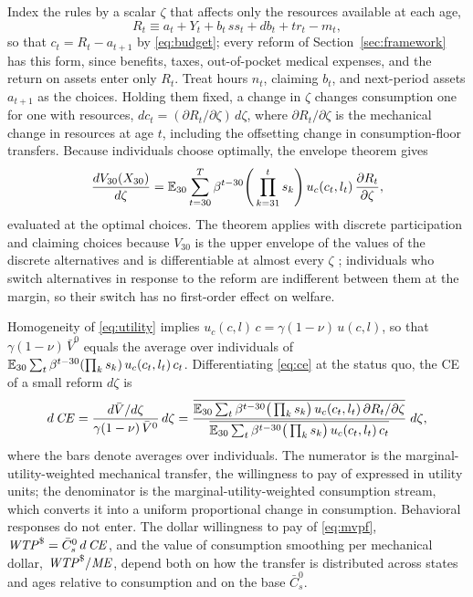 Index the rules by a scalar $\zeta$ that affects only the resources available at each age,
\begin{equation*}
R_t\equiv a_t+Y_t+b_t\,ss_t+db_t+tr_t-m_t,
\end{equation*}
so that $c_t=R_t-a_{t+1}$ by \eqref{eq:budget}; every reform of Section~\ref{sec:framework} has this form, since benefits, taxes, out-of-pocket medical expenses, and the return on assets enter only $R_t$. Treat hours $n_t$, claiming $b_t$, and next-period assets $a_{t+1}$ as the choices. Holding them fixed, a change in $\zeta$ changes consumption one for one with resources, $dc_t=(\partial R_t/\partial\zeta)\,d\zeta$, where $\partial R_t/\partial\zeta$ is the mechanical change in resources at age $t$, including the offsetting change in consumption-floor transfers. Because individuals choose optimally, the envelope theorem gives
\begin{equation*}
\frac{dV_{30}(X_{30})}{d\zeta}=\mathbb{E}_{30}\sum_{t=30}^{T}\beta^{t-30}\Bigg(\prod_{k=31}^{t}s_k\Bigg)\,u_c(c_t,l_t)\,\frac{\partial R_t}{\partial\zeta},
\end{equation*}
evaluated at the optimal choices. The theorem applies with discrete participation and claiming choices because $V_{30}$ is the upper envelope of the values of the discrete alternatives and is differentiable at almost every $\zeta$ \citep{milgrom2002envelope}; individuals who switch alternatives in response to the reform are indifferent between them at the margin, so their switch has no first-order effect on welfare.

Homogeneity of \eqref{eq:utility} implies $u_c(c,l)\,c=\gamma(1-\nu)\,u(c,l)$, so that $\gamma(1-\nu)\,\bar V^{0}$ equals the average over individuals of $\mathbb{E}_{30}\sum_{t}\beta^{t-30}(\prod_{k}s_k)\,u_c(c_t,l_t)\,c_t$. Differentiating \eqref{eq:ce} at the status quo, the CE of a small reform $d\zeta$ is
\begin{equation*}
d\,\mathit{CE}=\frac{d\bar V/d\zeta}{\gamma(1-\nu)\,\bar V^{0}}\,d\zeta
=\frac{\overline{\mathbb{E}_{30}\sum_{t}\beta^{t-30}\big(\prod_{k}s_k\big)\,u_c(c_t,l_t)\,\partial R_t/\partial\zeta}}{\overline{\mathbb{E}_{30}\sum_{t}\beta^{t-30}\big(\prod_{k}s_k\big)\,u_c(c_t,l_t)\,c_t}}\;d\zeta,
\end{equation*}
where the bars denote averages over individuals. The numerator is the marginal-utility-weighted mechanical transfer, the willingness to pay of \citet{hendren2016policy} expressed in utility units; the denominator is the marginal-utility-weighted consumption stream, which converts it into a uniform proportional change in consumption. Behavioral responses do not enter. The dollar willingness to pay of \eqref{eq:mvpf}, $\mathit{WTP}^{\$}=\bar C^{0}_{s}\,d\,\mathit{CE}$, and the value of consumption smoothing per mechanical dollar, $\mathit{WTP}^{\$}/\mathit{ME}$, depend both on how the transfer is distributed across states and ages relative to consumption and on the base $\bar C^{0}_{s}$.

